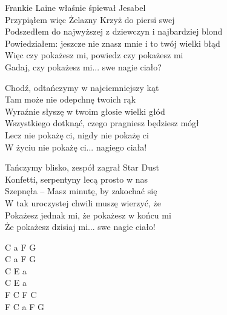 \begin{text}
    Frankie Laine właśnie śpiewał Jesabel\\
    Przypiąłem więc Żelazny Krzyż do piersi swej\\
    Podszedłem do najwyższej z dziewczyn i najbardziej blond\\
    Powiedziałem: jeszcze nie znasz mnie i to twój wielki błąd\\
    \vin Więc czy pokażesz mi, powiedz czy pokażesz mi\\
    \vin Gadaj, czy pokażesz mi... swe nagie ciało?

    Chodź, odtańczymy w najciemniejszy kąt\\
    Tam może nie odepchnę twoich rąk\\
    Wyraźnie słyszę w twoim głosie wielki głód\\
    Wszystkiego dotknąć, czego pragniesz będziesz mógł\\
    \vin Lecz nie pokażę ci, nigdy nie pokażę ci\\
    \vin W życiu nie pokażę ci... nagiego ciała!

    Tańczymy blisko, zespół zagrał Star Dust\\
    Konfetti, serpentyny lecą prosto w nas\\
    Szepnęła – Masz minutę, by zakochać się\\
    W tak uroczystej chwili muszę wierzyć, że\\
    \vin Pokażesz jednak mi, że pokażesz w końcu mi\\
    \vin Że pokażesz dzisiaj mi... swe nagie ciało!
\end{text}
\begin{chord}
    C a F G\\
    C a F G\\
    C E a\\
    C E a\\
    F C F C\\
    F C a F G
\end{chord}
